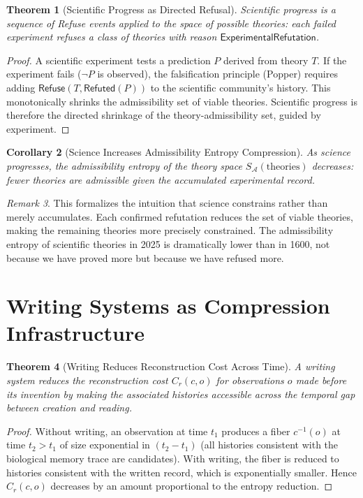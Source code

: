 \documentclass[12pt, a4paper, openany]{book}
\theoremstyle{plain}
\newtheorem{theorem}{Theorem}[chapter]
\newtheorem{corollary}[theorem]{Corollary}
\theoremstyle{definition}
\theoremstyle{remark}
\newtheorem{remark}[theorem]{Remark}
\newcommand{\Refuse}{\mathsf{Refuse}}
\newcommand{\calA}{\mathcal{A}}
\begin{document}
\begin{theorem}[Scientific Progress as Directed Refusal]
Scientific progress is a sequence of Refuse events applied to the space of
possible theories: each failed experiment refuses a class of theories with
reason $\mathsf{ExperimentalRefutation}$.
\end{theorem}

\begin{proof}
A scientific experiment tests a prediction $P$ derived from theory $T$. If
the experiment fails ($\neg P$ is observed), the falsification principle
(Popper) requires adding $\Refuse(T, \mathsf{Refuted}(P))$ to the scientific
community's history. This monotonically shrinks the admissibility set of
viable theories. Scientific progress is therefore the directed shrinkage of
the theory-admissibility set, guided by experiment.
\end{proof}

\begin{corollary}[Science Increases Admissibility Entropy Compression]
As science progresses, the admissibility entropy of the theory space
$S_{\calA}(\text{theories})$ decreases: fewer theories are admissible given
the accumulated experimental record.
\end{corollary}

\begin{remark}
This formalizes the intuition that science constrains rather than merely
accumulates. Each confirmed refutation reduces the set of viable theories,
making the remaining theories more precisely constrained. The admissibility
entropy of scientific theories in 2025 is dramatically lower than in 1600,
not because we have proved more but because we have refused more.
\end{remark}

\section{Writing Systems as Compression Infrastructure}

\begin{theorem}[Writing Reduces Reconstruction Cost Across Time]
A writing system reduces the reconstruction cost $C_r(c, o)$ for observations
$o$ made before its invention by making the associated histories accessible
across the temporal gap between creation and reading.
\end{theorem}

\begin{proof}
Without writing, an observation at time $t_1$ produces a fiber $c^{-1}(o)$
at time $t_2 > t_1$ of size exponential in $(t_2 - t_1)$ (all histories
consistent with the biological memory trace are candidates). With writing,
the fiber is reduced to histories consistent with the written record, which
is exponentially smaller. Hence $C_r(c, o)$ decreases by an amount proportional
to the entropy reduction.
\end{proof}
\end{document}
